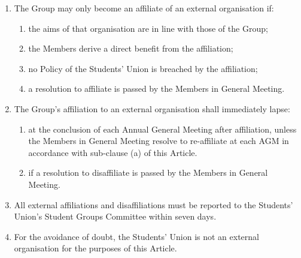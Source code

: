 \documentclass[12pt]{constitution}
\begin{document}


\begin{enumerate}
    \item The Group may only become an affiliate of an external organisation if:
    \begin{enumerate}
        \item the aims of that organisation are in line with those of the Group;
        \item the Members derive a direct benefit from the affiliation;
        \item no Policy of the Students' Union is breached by the affiliation;
        \item a resolution to affiliate is passed by the Members in General Meeting.
    \end{enumerate}

    \item The Group's affiliation to an external organisation shall immediately lapse:
    \begin{enumerate}
        \item at the conclusion of each Annual General Meeting after affiliation, unless the Members in General Meeting resolve to re-affiliate at each AGM in accordance with sub-clause (a) of this Article.
        \item if a resolution to disaffiliate is passed by the Members in General Meeting.
    \end{enumerate}

    \item All external affiliations and disaffiliations must be reported to the Students' Union's Student Groups Committee within seven days.
    \item For the avoidance of doubt, the Students' Union is not an external organisation for the purposes of this Article.
\end{enumerate}


\end{document}
